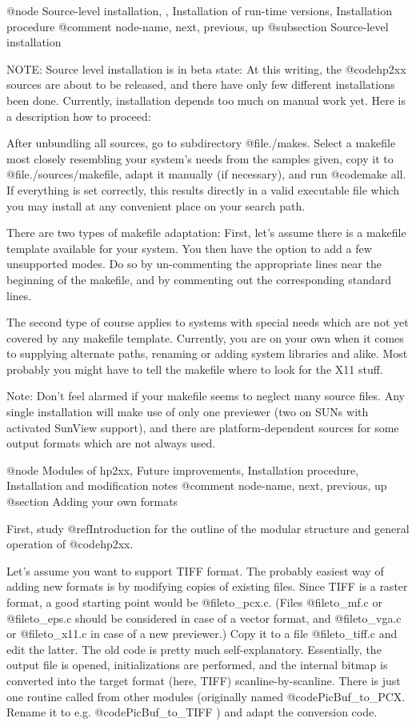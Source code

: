 @node Source-level installation, , Installation of run-time versions, Installation procedure
@comment  node-name,  next,  previous,  up
@subsection Source-level installation

NOTE: Source level installation is in beta state: At this writing,
the @code{hp2xx} sources are about to be released, and there have only few
different installations been done. Currently, installation depends too much
on manual work yet. Here is a description how to proceed:

After unbundling all sources, go to subdirectory @file{./makes}. Select a
makefile most closely resembling your system's needs from the samples given,
copy it to @file{./sources/makefile}, adapt it manually (if necessary),
and run @code{make all}.
If everything is set correctly, this results directly in a valid executable
file which you may install at any convenient place on your search path.

There are two types of makefile adaptation: First, let's assume there
is a makefile template available for your system. You then have the option to
add a few unsupported modes. Do so by un-commenting the appropriate lines
near the beginning of the makefile, and by commenting out the corresponding
standard lines.

The second type of course applies to systems with special needs which are not
yet covered by any makefile template. Currently, you are on your own when
it comes to supplying alternate paths, renaming or adding system libraries
and alike. Most probably you might have to tell the makefile where to
look for the X11 stuff.

Note: Don't feel alarmed if your makefile seems to neglect many source files.
Any single installation will make use of only one previewer (two on
SUNs with activated SunView support), and there are platform-dependent
sources for some output formats which are not always used.




@node Modules of hp2xx, Future improvements, Installation procedure, Installation and modification notes
@comment  node-name,  next,  previous,  up
@section Adding your own formats

First, study @ref{Introduction} for the outline of the modular structure and
general operation of @code{hp2xx}.

Let's assume you want to support TIFF format. The probably easiest way
of adding new formats is by modifying copies of existing files. Since TIFF
is a raster format, a good starting point would be @file{to_pcx.c}.
(Files @file{to_mf.c} or @file{to_eps.c} should be considered in case
of a vector format, and @file{to_vga.c} or @file{to_x11.c} in case of
a new previewer.) Copy it to a file @file{to_tiff.c} and edit the latter.
The old code is pretty much self-explanatory. Essentially, the output file
is opened, initializations are performed, and the internal bitmap is
converted into the target format (here, TIFF) scanline-by-scanline.
There is just one routine called from other modules (originally named
@code{PicBuf_to_PCX}. Rename it to e.g. @code{PicBuf_to_TIFF} ) and adapt
the conversion code.

